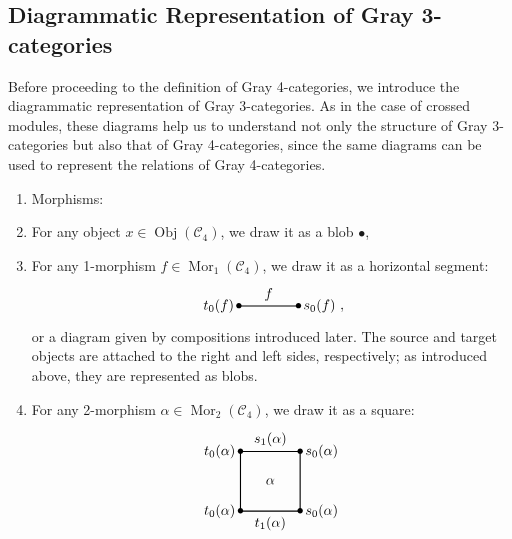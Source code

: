 \documentclass[11pt, reqno]{amsart} %
\newcommand{\obj}{{\mathop{\mathrm{Obj}}}}
\newcommand{\mor}{{\mathop{\mathrm{Mor}}}}
\newcommand{\cC}{{\mathcal{C}}}
\theoremstyle{definition}
\theoremstyle{remark}
\numberwithin{equation}{section}
\begin{document}
\subsection{Diagrammatic Representation of Gray 3-categories}\label{sec:diag-Gray3}
Before proceeding to the definition of Gray 4-categories, we introduce the diagrammatic representation of Gray 3-categories. As in the case of crossed modules, these diagrams help us to understand not only the structure of Gray 3-categories but also that of Gray 4-categories, since the same diagrams can be used to represent the relations of Gray 4-categories.

\begin{enumerate}
  \item Morphisms:
  \item [$\bullet$] For any object $x\in \obj(\cC_4)$, we draw it as a blob $\bullet$,
  \item [$\bullet$] For any 1-morphism $f\in \mor_1(\cC_4)$, we draw it as a horizontal segment:
  \begin{equation}
    \label{eq:Gray4-Diagram-1-Mor}
    \begin{tikzpicture}[baseline=(A.base)]
      \node (A) at (-0.75,0) {$\bullet$};
      \node (B) at (0.75,0) {$\bullet$};
      \draw [thick] (A.center) to node [anchor=south] {$f$} (B.center);
      \node at (B.center) [anchor=west] {$s_0(f)$};
      \node at (A.center) [anchor=east] {$t_0(f)$};
    \end{tikzpicture},
  \end{equation}
  or a diagram given by compositions introduced later. The source and target objects are attached to the right and left sides, respectively; as introduced above, they are represented as blobs.
  \item [$\bullet$] For any 2-morphism $\alpha\in\mor_2(\cC_4)$, we draw it as a square:
  \begin{equation}
    \label{eq:Gray4-Diagram-2-Mor}
    \begin{tikzpicture}[baseline=(T.base)]
      \node (A) at (-0.75,0.75) {$\bullet$};
      \node (B) at (0.75,0.75) {$\bullet$};
      \node (C) at (0.75,-0.75) {$\bullet$};
      \node (D) at (-0.75,-0.75) {$\bullet$};
      \draw [thick] (A.center) node [anchor=east] {$t_0(\alpha)$} to node [anchor=south] {$s_1(\alpha)$} (B.center) node [anchor=west] {$s_0(\alpha)$} to (C.center) node [anchor=west] {$s_0(\alpha)$} to node [anchor=north] {$t_1(\alpha)$} (D.center) node [anchor=east] {$t_0(\alpha)$} to cycle;
      \node (T) at (0,0) {$\alpha$};
    \end{tikzpicture}

\end{equation}
\end{enumerate}
\end{document}
